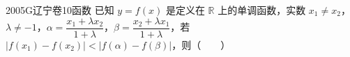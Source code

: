 
\begin{problem}{2005}{G}{辽宁卷}{10}{函数}
已知 $ y = f(x) $ 是定义在 $ \mathbb{R} $ 上的单调函数，实数 $ x_1 \ne x_2 $，$ \lambda \ne -1 $，$ \alpha = \dfrac{x_1 + \lambda x_2}{1 + \lambda} $，$ \beta = \dfrac{x_2 + \lambda x_1}{1 + \lambda} $，若 $ |f(x_1) - f(x_2)| < |f(\alpha) - f(\beta)| $，则（　　）

\begin{choices}
\end{choices}
\end{problem}

\begin{answer}

\end{answer}

\begin{solutions}

\end{solutions}